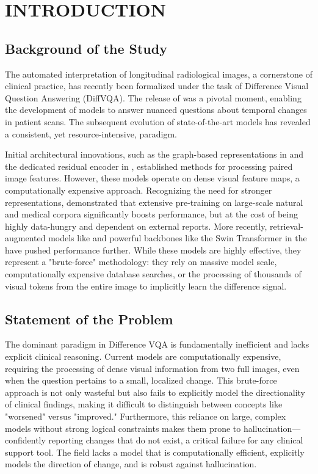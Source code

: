 \chapter{INTRODUCTION} 

\section{Background of the Study}
The automated interpretation of longitudinal radiological images, a cornerstone of clinical practice, has recently been formalized under the task of Difference Visual Question Answering (DiffVQA). The release of \cite{medical-dff-vqa} was a pivotal moment, enabling the development of models to answer nuanced questions about temporal changes in patient scans. The subsequent evolution of state-of-the-art models has revealed a consistent, yet resource-intensive, paradigm.

Initial architectural innovations, such as the graph-based representations in \cite{ekaid} and the dedicated residual encoder in \cite{real}, established methods for processing paired image features. However, these models operate on dense visual feature maps, a computationally expensive approach. Recognizing the need for stronger representations, \cite{plural} demonstrated that extensive pre-training on large-scale natural and medical corpora significantly boosts performance, but at the cost of being highly data-hungry and dependent on external reports. More recently, retrieval-augmented models like \cite{regiomix} and powerful backbones like the Swin Transformer in the \cite{encoder-decoder} have pushed performance further. While these models are highly effective, they represent a "brute-force" methodology: they rely on massive model scale, computationally expensive database searches, or the processing of thousands of visual tokens from the entire image to implicitly learn the difference signal.

\section{Statement of the Problem}
The dominant paradigm in Difference VQA is fundamentally inefficient and lacks explicit clinical reasoning. Current models are computationally expensive, requiring the processing of dense visual information from two full images, even when the question pertains to a small, localized change. This brute-force approach is not only wasteful but also fails to explicitly model the directionality of clinical findings, making it difficult to distinguish between concepts like "worsened" versus "improved." Furthermore, this reliance on large, complex models without strong logical constraints makes them prone to hallucination—confidently reporting changes that do not exist, a critical failure for any clinical support tool. The field lacks a model that is computationally efficient, explicitly models the direction of change, and is robust against hallucination.

